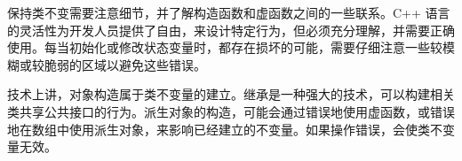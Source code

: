 保持类不变需要注意细节，并了解构造函数和虚函数之间的一些联系。C++ 语言的灵活性为开发人员提供了自由，来设计特定行为，但必须充分理解，并需要正确使用。每当初始化或修改状态变量时，都存在损坏的可能，需要仔细注意一些较模糊或较脆弱的区域以避免这些错误。

技术上讲，对象构造属于类不变量的建立。继承是一种强大的技术，可以构建相关类共享公共接口的行为。派生对象的构造，可能会通过错误地使用虚函数，或错误地在数组中使用派生对象，来影响已经建立的不变量。如果操作错误，会使类不变量无效。
